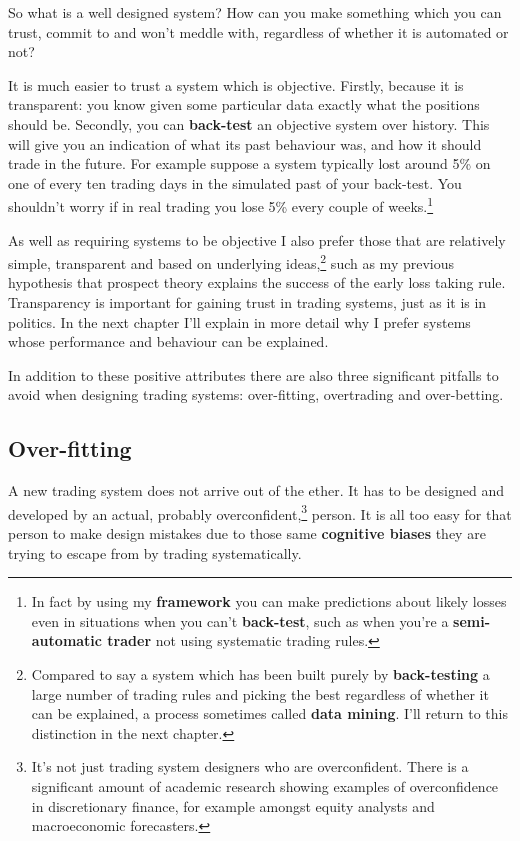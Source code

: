 So what is a well designed system? How can you make something which you can trust, commit to and won't meddle with, regardless of whether it is automated or not?

It is much easier to trust a system which is objective. Firstly, because it is transparent: you know given some particular data exactly what the positions should be. Secondly, you can \textbf{back-test} an objective system over history. This will give you an indication of what its past behaviour was, and how it should trade in the future. For example suppose a system typically lost around 5\% on one of every ten trading days in the simulated past of your back-test. You shouldn't worry if in real trading you lose 5\% every couple of weeks.\footnote{In fact by using my \textbf{framework} you can make predictions about likely losses even in situations when you can't \textbf{back-test}, such as when you're a \textbf{semi-automatic trader} not using systematic trading rules.}

As well as requiring systems to be objective I also prefer those that are relatively simple, transparent and based on underlying ideas,\footnote{Compared to say a system which has been built purely by \textbf{back-testing} a large number of trading rules and picking the best regardless of whether it can be explained, a process sometimes called \textbf{data mining}. I'll return to this distinction in the next chapter.} such as my previous hypothesis that prospect theory explains the success of the early loss taking rule. Transparency is important for gaining trust in trading systems, just as it is in politics. In the next chapter I'll explain in more detail why I prefer systems whose performance and behaviour can be explained.

In addition to these positive attributes there are also three significant pitfalls to avoid when designing trading systems: over-fitting, overtrading and over-betting.

\subsection*{Over-fitting}

A new trading system does not arrive out of the ether. It has to be designed and developed by an actual, probably overconfident,\footnote{It's not just trading system designers who are overconfident. There is a significant amount of academic research showing examples of overconfidence in discretionary finance, for example amongst equity analysts and macroeconomic forecasters.} person. It is all too easy for that person to make design mistakes due to those same \textbf{cognitive biases} they are trying to escape from by trading systematically.

